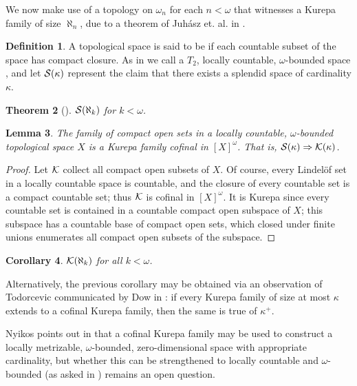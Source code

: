 \documentclass{rmmcart}
\theoremstyle{plain}
\newtheorem{theorem}{Theorem}
\newtheorem{lemma}[theorem]{Lemma}
\newtheorem{corollary}[theorem]{Corollary}
\theoremstyle{definition}
\newtheorem{definition}[theorem]{Definition}
\theoremstyle{remark}
\theoremstyle{plain}
\theoremstyle{definition}
\theoremstyle{remark}
\begin{document}
  We now make use of
  a topology on \(\omega_n\) for each \(n<\omega\) that
  witnesses a Kurepa family of size \(\aleph_n\), due to a theorem of
  Juh\'asz et. al. in \cite{MR539228}.

  \begin{definition}
    A topological space is said to be 
    if each countable subset of the space has compact closure.
    As in \cite{MR539228} we call a
    \(T_2\), locally countable, \(\omega\)-bounded space
    , and let \(\mathcal{S}(\kappa)\) represent
    the claim that there exists a splendid space of cardinality \(\kappa\).
  \end{definition}

  \begin{theorem}[\cite{MR539228}]
    \(\mathcal{S}(\aleph_k)\) for \(k<\omega\).
  \end{theorem}

  \begin{lemma}
    The family of compact open sets in a locally countable, \(\omega\)-bounded
    topological space \(X\)
    is a Kurepa family cofinal in \([X]^\omega\). That is,
    \(\mathcal{S}(\kappa) \Rightarrow \mathcal{K}(\kappa)\).
  \end{lemma}

  \begin{proof}
    Let \(\mathcal{K}\) collect all compact
    open subsets of \(X\). Of course, every Lindel\"of set in
    a locally countable space is countable, and the closure of every
    countable set is a compact countable set; thus \(\mathcal{K}\)
    is cofinal in \([X]^\omega\).
    It is Kurepa since every countable set is contained in a countable
    compact open subspace of \(X\); this subspace has a countable
    base of compact open sets, which closed under finite unions enumerates
    all compact open subsets of the subspace.
  \end{proof}

  \begin{corollary}
    \(\mathcal{K}(\aleph_k)\) for all \(k<\omega\).
  \end{corollary}

  Alternatively, the previous corollary may be obtained
  via an observation of Todorcevic
  communicated by Dow in \cite{MR1229125}:
  if every Kurepa family of size at most \(\kappa\)
  extends to a cofinal Kurepa family, then the same is true of \(\kappa^+\).

  Nyikos points out in \cite{NYIKOSKUREPA} that a cofinal Kurepa family may
  be used to construct a locally metrizable, \(\omega\)-bounded,
  zero-dimensional space with appropriate cardinality,
  but whether this can be
  strengthened to locally countable and \(\omega\)-bounded (as asked in
  \cite{MR539228}) remains an open question.
\end{document}
